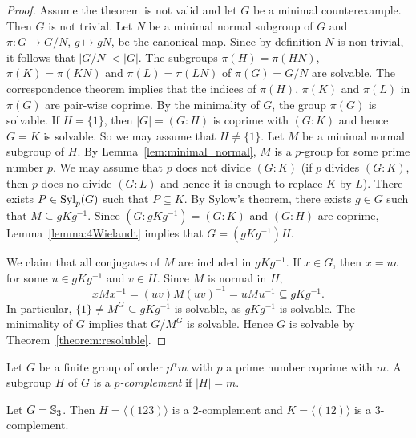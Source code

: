 \begin{proof}
	Assume the theorem is not valid and let $G$ be a minimal counterexample. 
	Then $G$ is not trivial.  
	Let $N$ be a minimal normal subgroup of 
	$G$ and $\pi\colon G\to G/N$, $g\mapsto gN$, be the canonical map. Since 
	by definition $N$ is non-trivial, 
	it follows that $|G/N|<|G|$. 
	The subgroups 
	$\pi(H)=\pi(HN)$, $\pi(K)=\pi(KN)$ and $\pi(L)=\pi(LN)$ of $\pi(G)=G/N$ are solvable. 
	The correspondence theorem implies that 
	the indices of $\pi(H)$, $\pi(K)$ and $\pi(L)$ in $\pi(G)$ are pair-wise coprime. By the 
	minimality of $G$, the group 
	$\pi(G)$ is solvable. If $H=\{1\}$, then 
	$|G|=(G:H)$ is coprime with $(G:K)$ and hence $G=K$ is solvable. So we may assume that  
	$H\ne \{1\}$. Let $M$ be a minimal normal subgroup of $H$. By
	Lemma~\ref{lem:minimal_normal}, $M$ is a $p$-group for some prime number $p$. We may
	assume that $p$ does not divide 
	$(G:K)$ (if $p$ divides $(G:K)$, then $p$ does no divide $(G:L)$ and 
	hence it is enough to replace $K$ by $L$). There exists 
	$P\in\mathrm{Syl}_p(G)$ such that $P\subseteq K$. By Sylow's theorem, 
	there exists  $g\in G$ such that $M\subseteq
	gKg^{-1}$. Since $(G:gKg^{-1})=(G:K)$ and $(G:H)$ are coprime, 
	Lemma~\ref{lemma:4Wielandt} implies that $G=(gKg^{-1})H$. 
	
	We claim that all  conjugates of $M$ are included in $gKg^{-1}$. 
	If $x\in G$, then $x=uv$ for some $u\in 
	gKg^{-1}$ and $v\in H$. Since $M$ is normal in $H$, 
	\[
	xMx^{-1}=(uv)M(uv)^{-1}=uMu^{-1}\subseteq gKg^{-1}.
	\]
	In particular, $\{1\}\ne M^G\subseteq gKg^{-1}$ is solvable, as $gKg^{-1}$ is
	solvable. The minimality of $G$ implies that $G/M^G$ is solvable. Hence 
	$G$ is solvable by Theorem~\ref{theorem:resoluble}.
\end{proof}


Let $G$ be a finite group of order $p^{\alpha}m$ with $p$ a prime number coprime with $m$. 
A subgroup $H$ of $G$ is a {\em $p$-complement} if $|H|=m$. 

\begin{example}
	Let $G=\mathbb{S}_3$. Then $H=\langle (123)\rangle$ is a $2$-complement 
	and $K=\langle (12)\rangle$ is a $3$-complement.
\end{example}


%

